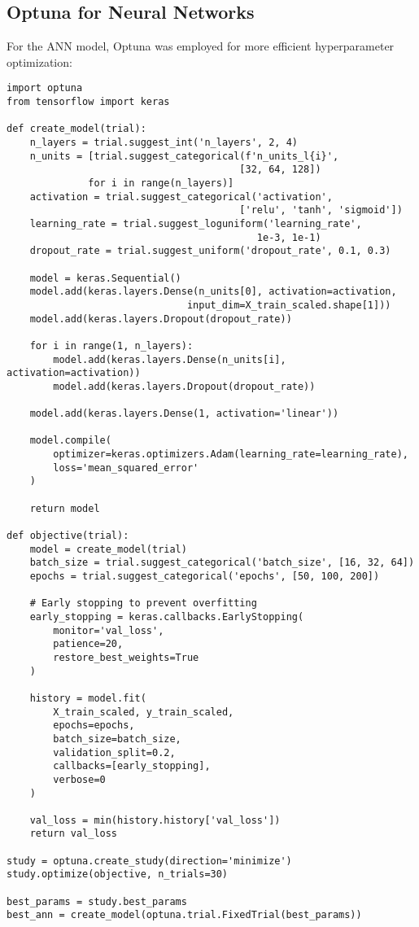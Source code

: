 \documentclass[12pt]{article}
\begin{document}
\subsection{Optuna for Neural Networks}
\label{subsec:optuna}

For the ANN model, Optuna was employed for more efficient hyperparameter optimization:

\begin{verbatim}
import optuna
from tensorflow import keras

def create_model(trial):
    n_layers = trial.suggest_int('n_layers', 2, 4)
    n_units = [trial.suggest_categorical(f'n_units_l{i}', 
                                        [32, 64, 128]) 
              for i in range(n_layers)]
    activation = trial.suggest_categorical('activation', 
                                        ['relu', 'tanh', 'sigmoid'])
    learning_rate = trial.suggest_loguniform('learning_rate', 
                                           1e-3, 1e-1)
    dropout_rate = trial.suggest_uniform('dropout_rate', 0.1, 0.3)
    
    model = keras.Sequential()
    model.add(keras.layers.Dense(n_units[0], activation=activation, 
                               input_dim=X_train_scaled.shape[1]))
    model.add(keras.layers.Dropout(dropout_rate))
    
    for i in range(1, n_layers):
        model.add(keras.layers.Dense(n_units[i], activation=activation))
        model.add(keras.layers.Dropout(dropout_rate))
    
    model.add(keras.layers.Dense(1, activation='linear'))
    
    model.compile(
        optimizer=keras.optimizers.Adam(learning_rate=learning_rate),
        loss='mean_squared_error'
    )
    
    return model

def objective(trial):
    model = create_model(trial)
    batch_size = trial.suggest_categorical('batch_size', [16, 32, 64])
    epochs = trial.suggest_categorical('epochs', [50, 100, 200])
    
    # Early stopping to prevent overfitting
    early_stopping = keras.callbacks.EarlyStopping(
        monitor='val_loss',
        patience=20,
        restore_best_weights=True
    )
    
    history = model.fit(
        X_train_scaled, y_train_scaled,
        epochs=epochs,
        batch_size=batch_size,
        validation_split=0.2,
        callbacks=[early_stopping],
        verbose=0
    )
    
    val_loss = min(history.history['val_loss'])
    return val_loss

study = optuna.create_study(direction='minimize')
study.optimize(objective, n_trials=30)

best_params = study.best_params
best_ann = create_model(optuna.trial.FixedTrial(best_params))
\end{verbatim}
\end{document}
